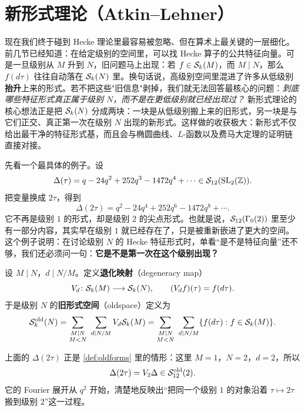 \section{新形式理论（Atkin--Lehner）}
\label{sec:newforms}

现在我们终于碰到 Hecke 理论里最容易被忽略、但在算术上最关键的一层细化。前几节已经知道：在给定级别的空间里，可以找 Hecke 算子的公共特征向量。可是一旦级别从 $M$ 升到 $N$，旧问题马上出现：若 $f \in \mathcal{S}_k(M)$，而 $M \mid N$，那么 $f(d\tau)$ 往往自动落在 $\mathcal{S}_k(N)$ 里。换句话说，高级别空间里混进了许多从低级别\textbf{抬升}上来的形式。若不把这些"旧信息"剥掉，我们就无法回答最核心的问题：\emph{到底哪些特征形式真正属于级别 $N$，而不是在更低级别就已经出现过？} 新形式理论的核心想法正是把 $\mathcal{S}_k(N)$ 分成两块：一块是从低级别搬上来的旧形式，另一块是与它们正交、真正第一次在级别 $N$ 出现的新形式。这样做的收获极大：新形式不仅给出最干净的特征形式基，而且会与椭圆曲线、$L$-函数以及费马大定理的证明链直接对接。

先看一个最具体的例子。设
\[
  \Delta(\tau)=q-24q^2+252q^3-1472q^4+\cdots \in \mathcal{S}_{12}(\mathrm{SL}_2(\mathbb{Z})).
\]
把变量换成 $2\tau$，得到
\[
  \Delta(2\tau)=q^2-24q^4+252q^6-1472q^8+\cdots.
\]
它不再是级别 $1$ 的形式，却是级别 $2$ 的尖点形式。也就是说，$\mathcal{S}_{12}(\Gamma_0(2))$ 里至少有一部分内容，其实早在级别 $1$ 就已经存在了，只是被重新嵌进了更大的空间。这个例子说明：在讨论级别 $N$ 的 Hecke 特征形式时，单看“是不是特征向量”还不够，我们还必须问一句：\textbf{它是不是第一次在这个级别出现？}

\begin{definition}[退化映射与旧形式空间]
\label{def:oldforms}
设 $M \mid N$，$d \mid N/M$。定义\textbf{退化映射}（degeneracy map）
\[
  V_d\colon \mathcal{S}_k(M) \longrightarrow \mathcal{S}_k(N),\qquad (V_df)(\tau)=f(d\tau).
\]
于是级别 $N$ 的\textbf{旧形式空间}（oldspace）定义为
\[
  \mathcal{S}_k^{\mathrm{old}}(N)
  = \sum_{\substack{M\mid N \\ M<N}}\ \sum_{d\mid N/M} V_d\mathcal{S}_k(M)
  = \sum_{\substack{M\mid N \\ M<N}}\ \sum_{d\mid N/M}
    \{f(d\tau):f\in \mathcal{S}_k(M)\}.
\]
\end{definition}

\begin{example}[级别 $2$ 里的旧形式]
上面的 $\Delta(2\tau)$ 正是 \cref{def:oldforms} 里的情形：这里 $M=1$，$N=2$，$d=2$，所以
\[
  \Delta(2\tau)=V_2\Delta\in \mathcal{S}_{12}^{\mathrm{old}}(2).
\]
它的 Fourier 展开从 $q^2$ 开始，清楚地反映出“把同一个级别 $1$ 的对象沿着 $\tau\mapsto 2\tau$ 搬到级别 $2$”这一过程。
\end{example}

